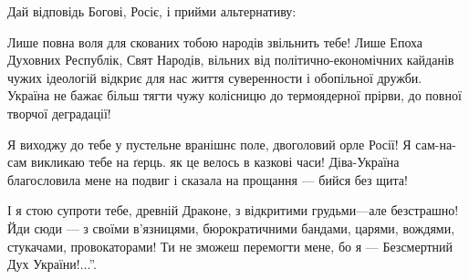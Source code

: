 Дай відповідь Богові, Росіє, і прийми альтернативу:

Лише повна воля для скованих тобою народів звільнить тебе! Лише Епоха Духовних
Республік, Свят Народів, вільних від політично-економічних кайданів чужих
ідеологій відкриє для нас життя суверенности і обопільної дружби. Україна не
бажає більш тягти чужу колісницю до термоядерної прірви, до повної творчої
деградації!

Я виходжу до тебе у пустельне вранішнє поле, двоголовий орле Росії! Я
сам-на-сам викликаю тебе на ґерць. як це велось в казкові часи! Діва-Україна
благословила мене на подвиг і сказала на прощання — бийся без щита!

І я стою супроти тебе, древній Драконе, з відкритими грудьми—але безстрашно!
Йди сюди — з своїми в'язницями, бюрократичними бандами, царями, вождями,
стукачами, провокаторами! Ти не зможеш перемогти мене, бо я — Безсмертний Дух
України!...''.
